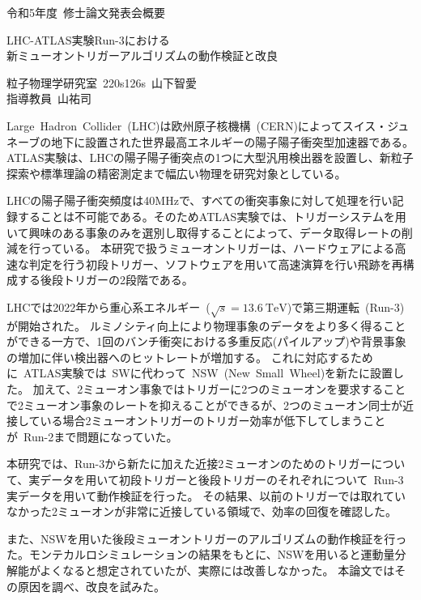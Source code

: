 \pagestyle{empty}

\begin{center}
    \begin{large}
        令和5年度~修士論文発表会概要 
    \end{large}
\end{center}

\begin{center}
  \begin{Large}
     LHC-ATLAS実験Run-3における\\新ミューオントリガーアルゴリズムの動作検証と改良
  \end{Large}
\end{center}

\begin{flushright}
    粒子物理学研究室~220s126s~山下智愛 \\
    指導教員~山\ajTatsuSaki 祐司
\end{flushright}

\vspace{10pt}

Large~Hadron~Collider~(LHC)は欧州原子核機構~(CERN)によってスイス・ジュネーブの地下に設置された世界最高エネルギーの陽子陽子衝突型加速器である。ATLAS実験は、LHCの陽子陽子衝突点の1つに大型汎用検出器を設置し、新粒子探索や標準理論の精密測定まで幅広い物理を研究対象としている。

LHCの陽子陽子衝突頻度は40MHzで、すべての衝突事象に対して処理を行い記録することは不可能である。そのためATLAS実験では、トリガーシステムを用いて興味のある事象のみを選別し取得することによって、データ取得レートの削減を行っている。
本研究で扱うミューオントリガーは、ハードウェアによる高速な判定を行う初段トリガー、ソフトウェアを用いて高速演算を行い飛跡を再構成する後段トリガーの2段階である。

LHCでは2022年から重心系エネルギー~($\sqrt{s}=\SI{13.6}{\TeV}$)で第三期運転~(Run-3)が開始された。
ルミノシティ向上により物理事象のデータをより多く得ることができる一方で、1回のバンチ衝突における多重反応(パイルアップ)や背景事象の増加に伴い検出器へのヒットレートが増加する。
これに対応するために~ATLAS実験では~SWに代わって~NSW~(New~Small~Wheel)を新たに設置した。
加えて、2ミューオン事象ではトリガーに2つのミューオンを要求することで2ミューオン事象のレートを抑えることができるが、2つのミューオン同士が近接している場合2ミューオントリガーのトリガー効率が低下してしまうことが~Run-2まで問題になっていた。


本研究では、Run-3から新たに加えた近接2ミューオンのためのトリガーについて、実データを用いて初段トリガーと後段トリガーのそれぞれについて~Run-3実データを用いて動作検証を行った。
その結果、以前のトリガーでは取れていなかった2ミューオンが非常に近接している領域で、効率の回復を確認した。

また、NSWを用いた後段ミューオントリガーのアルゴリズムの動作検証を行った。モンテカルロシミュレーションの結果をもとに、NSWを用いると運動量分解能がよくなると想定されていたが、実際には改善しなかった。
本論文ではその原因を調べ、改良を試みた。